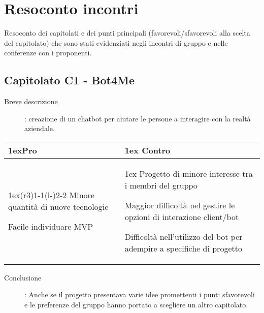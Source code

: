 \section{Resoconto incontri}
Resoconto dei capitolati e dei punti principali (favorevoli/sfavorevoli alla scelta del capitolato) che sono stati evidenziati negli incontri di gruppo e nelle conferenze con i proponenti.

\subsection{Capitolato C1 - Bot4Me}
\begin{description}
	\item [Breve descrizione]: creazione di un chatbot per aiutare le persone a interagire con la realtà aziendale.
\end{description}
\begin{table}[h]
\begin{tabularx}{\linewidth}{>{\parskip1ex}X@{\kern4\tabcolsep}>{\parskip1ex}X}
\hfil\bfseries Pro
&
\hfil\bfseries Contro
\\\cmidrule(r{3\tabcolsep}){1-1}\cmidrule(l{-\tabcolsep}){2-2}
Minore quantità di nuove tecnologie \par
Facile individuare MVP
&
Progetto di minore interesse tra i membri del gruppo \par
Maggior difficoltà nel gestire le opzioni di interazione client/bot \par
Difficoltà nell'utilizzo del bot per adempire a specifiche di progetto
\end{tabularx}
\end{table}
\begin{description}
	\item [Conclusione]: Anche se il progetto presentava varie idee promettenti i punti sfavorevoli e le preferenze del gruppo hanno portato a scegliere un altro capitolato.
\end{description}

\vspace{1cm}

